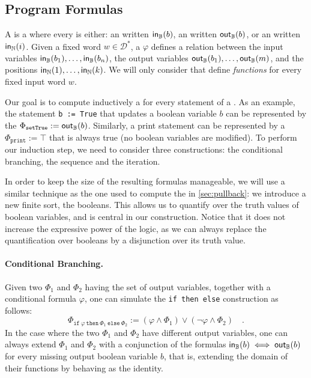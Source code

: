 \subsection{Program Formulas}
\label{sec:program-formulas}

\AP A  is a  where every
 is either: an   written
$\mathsf{in}_{\mathbb{B}}(b)$,  an  written $\mathsf{out}_{\mathbb{B}}(b)$, or an
 written $\mathsf{in}_{\mathbb{N}}(i)$. Given a fixed word $w \in
\mathcal{D}^*$, a  $\varphi$ defines a relation between the
input variables $\mathsf{in}_{\mathbb{B}}(b_1), \dots, \mathsf{in}_{\mathbb{B}}(b_n)$, the output variables
$\mathsf{out}_{\mathbb{B}}(b_1), \dots, \mathsf{out}_{\mathbb{B}}(m)$, and the positions $\mathsf{in}_{\mathbb{N}}(1), \dots,
\mathsf{in}_{\mathbb{N}}(k)$. We will only consider  that define
\emph{functions} for every fixed input word $w$.

Our goal is to compute inductively a  for every statement
of a . As an example, the statement \texttt{b := True}
that updates a boolean variable $b$ can be represented by the  $\Phi_{\texttt{setTrue}} := \mathsf{out}_{\mathbb{B}}(b)$. Similarly, a print statement
can be represented by a  $\Phi_{\texttt{print}} := \top$
that is always true (no boolean variables are modified). To perform our
induction step, we need to consider three constructions: the conditional
branching, the sequence and the iteration.

In order to keep the size of the resulting formulas manageable, we will use a
similar technique as the one used to compute the  in
\cref{sec:pullback}: we introduce
a new finite sort, the booleans. This allows us to quantify over the truth
values of boolean variables, and is central in our construction. Notice that it
does not increase the expressive power of the logic, as we can always replace
the quantification over booleans by a disjunction over its truth value.

\paragraph{Conditional Branching.} 
Given two  $\Phi_1$ and $\Phi_2$ having 
the set of output variables,
together with a conditional formula $\varphi$, one can 
simulate the \texttt{if then else} construction 
as follows:
\begin{equation*}
    \Phi_{\texttt{if}~\varphi~\texttt{then}~\Phi_1~\texttt{else}~\Phi_2} := (\varphi \land \Phi_1) \lor (\neg \varphi \land \Phi_2) \quad .
\end{equation*}
In the case where the two  $\Phi_1$ and $\Phi_2$ have
different output variables, one can always extend $\Phi_1$ and $\Phi_2$ with
a conjunction of the
formulas $\mathsf{in}_{\mathbb{B}}(b) \iff \mathsf{out}_{\mathbb{B}}(b)$ for every missing output boolean variable $b$,
that is, extending the domain of their functions by behaving as the identity.

